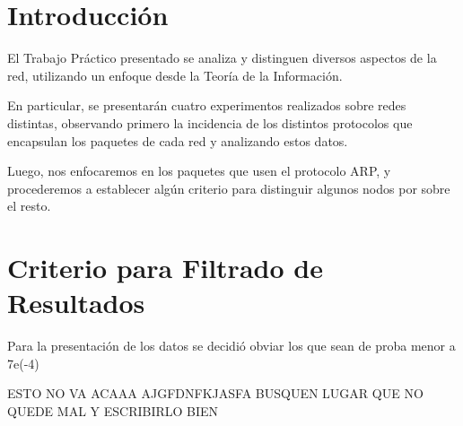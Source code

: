 \documentclass{article}
\theoremstyle{definition}
\theoremstyle{remark}
\begin{document}
\materia{} %

\subtitulo{}
\grupo{}

 
\maketitle

\pagebreak

\tableofcontents

\pagebreak

\section{Introducción}

El Trabajo Práctico presentado se analiza y distinguen diversos aspectos de la red, utilizando un enfoque desde la Teoría de la Información.

En particular, se presentarán cuatro experimentos realizados sobre redes distintas, observando primero la incidencia de los distintos protocolos que encapsulan los paquetes de cada red y analizando estos datos.

Luego, nos enfocaremos en los paquetes que usen el protocolo ARP, y procederemos a establecer algún criterio para distinguir algunos nodos por sobre el resto.

\newpage

\section{Criterio para Filtrado de Resultados}

Para la presentación de los datos se decidió obviar los que sean de proba menor a 7e(-4)

\begin{LARGE}

ESTO NO VA ACAAA AJGFDNFKJASFA BUSQUEN LUGAR QUE NO QUEDE MAL
Y ESCRIBIRLO BIEN
\end{LARGE}
\end{document}
